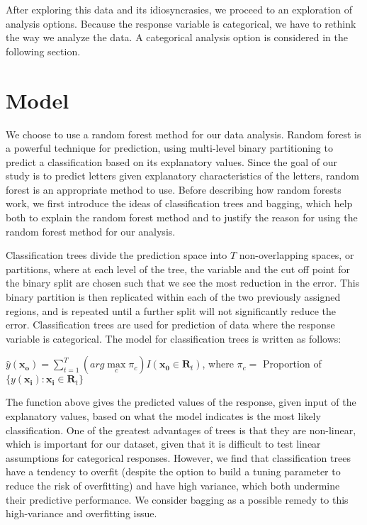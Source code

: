 \documentclass{svproc}
\begin{document}
After exploring this data and its idiosyncrasies, we proceed to an exploration of analysis options. Because the response variable is categorical, we have to rethink the way we analyze the data. A categorical analysis option is considered in the following section.

\section{Model}

We choose to use a random forest method for our data analysis. Random forest is a powerful technique for prediction, using multi-level binary partitioning to predict a classification based on its explanatory values. Since the goal of our study is to predict letters given explanatory characteristics of the letters, random forest is an appropriate method to use. Before describing how random forests work, we first introduce the ideas of classification trees and bagging, which help both to explain the random forest method and to justify the reason for using the random forest method for our analysis. 

Classification trees divide the prediction space into $T$ non-overlapping spaces, or partitions, where at each level of the tree, the variable and the cut off point for the binary split are chosen such that we see the most reduction in the error. This binary partition is then replicated within each of the two previously assigned regions, and is repeated until a further split will not significantly reduce the error. Classification trees are used for prediction of data where the response variable is categorical. The model for classification trees is written as follows:

\begin{center}
$\hat{y}(\mathbf{x_o}) = \sum\limits_{t=1}^T (arg \max\limits_c \pi_c) I(\mathbf{x_0} \in \mathbf{R}_t)$, where $\pi_c =$ Proportion of $\{y(\mathbf{x_i}): \mathbf{x_i} \in \mathbf{R}_t\}$
\end{center}

The function above gives the predicted values of the response, given input of the explanatory values, based on what the model indicates is the most likely classification. One of the greatest advantages of trees is that they are non-linear, which is important for our dataset, given that it is difficult to test linear assumptions for categorical responses. However, we find that classification trees have a tendency to overfit (despite the option to build a tuning parameter to reduce the risk of overfitting) and have high variance, which both undermine their predictive performance. We consider bagging as a possible remedy to this high-variance and overfitting issue.
\end{document}
